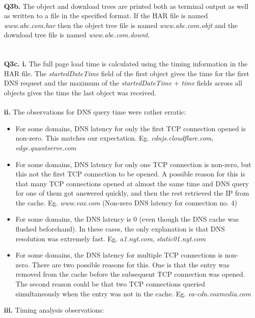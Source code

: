 \documentclass[12pt]{article}
\begin{document}
~\\
{\bfseries Q3b.} The object and download trees are printed both as terminal output as well as written to a file in the specified format. If the HAR file is named \emph{www.abc.com.har} then the object tree file is named \emph{www.abc.com.objt} and the download tree file is named \emph{www.abc.com.downt}.
\\\\\\
{\bfseries Q3c. i.} The full page load time is calculated using the timing information in the HAR file. The \emph{startedDateTime} field of the first object gives the time for the first DNS request and the maximum of the \emph{startedDateTime} + \emph{time} fields across all objects gives the time the last object was received. \\\\
\textbf{ii.} The observations for DNS query time were rather erratic:
\begin{itemize}
\item For some domains, DNS latency for only the first TCP connection opened is non-zero. This matches our expectation. Eg. \emph{cdnjs.cloudflare.com}, \emph{edge.quantserve.com}
\item For some domains, DNS latency for only one TCP connection is non-zero, but this not the first TCP connection to be opened. A possible reason for this is that many TCP connections opened at almost the same time and DNS query for one of them got answered quickly, and then the rest retrieved the IP from the cache. Eg. \emph{www.vox.com} (Non-zero DNS latency for connection no. 4)
\item For some domains, the DNS latency is 0 (even though the DNS cache was flushed beforehand). In these cases, the only explanation is that DNS resolution was extremely fast. Eg. \emph{a1.nyt.com}, \emph{static01.nyt.com} %
\item For some domains, the DNS latency for multiple TCP connections is non-zero. There are two possible reasons for this. One is that the entry was removed from the cache before the subsequent TCP connection was opened. The second reason could be that two TCP connections queried simultaneously when the entry was not in the cache. Eg. \emph{ea-cdn.voxmedia.com}
\end{itemize}
\textbf{iii.} Timing analysis observations:
\end{document}

